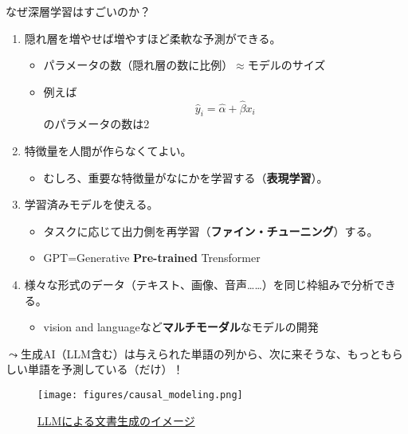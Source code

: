 \documentclass[
  xelatex,
  ja=standard]{bxjsarticle}
\providecommand{\tightlist}{%
  \setlength{\itemsep}{0pt}\setlength{\parskip}{0pt}}\usepackage{longtable,booktabs,array}
\begin{document}
なぜ深層学習はすごいのか？

\begin{enumerate}
\def\labelenumi{\arabic{enumi}.}
\tightlist
\item
  隠れ層を増やせば増やすほど柔軟な予測ができる。

  \begin{itemize}
  \tightlist
  \item
    パラメータの数（隠れ層の数に比例）\(\approx\)モデルのサイズ
  \item
    例えば\[\hat{y}_i = \hat{\alpha} + \hat{\beta} x_i\]のパラメータの数は2
  \end{itemize}
\item
  特徴量を人間が作らなくてよい。

  \begin{itemize}
  \tightlist
  \item
    むしろ、重要な特徴量がなにかを学習する（\textbf{表現学習}）。
  \end{itemize}
\item
  学習済みモデルを使える。

  \begin{itemize}
  \tightlist
  \item
    タスクに応じて出力側を再学習（\textbf{ファイン・チューニング}）する。
  \item
    GPT=Generative \textbf{Pre-trained} Trensformer
  \end{itemize}
\item
  様々な形式のデータ（テキスト、画像、音声\ldots\ldots）を同じ枠組みで分析できる。

  \begin{itemize}
  \tightlist
  \item
    vision and languageなど\textbf{マルチモーダル}なモデルの開発
  \end{itemize}
\end{enumerate}

\(\leadsto\)生成AI（LLM含む）は与えられた単語の列から、次に来そうな、もっともらしい単語を予測している（だけ）！

\begin{figure}[htpb]

{\centering \texttt{[image: figures/causal\_modeling.png]}

}

\caption{\href{https://huggingface.co/learn/nlp-course/ja/chapter1/4}{LLMによる文書生成のイメージ}}

\end{figure}
\end{document}
